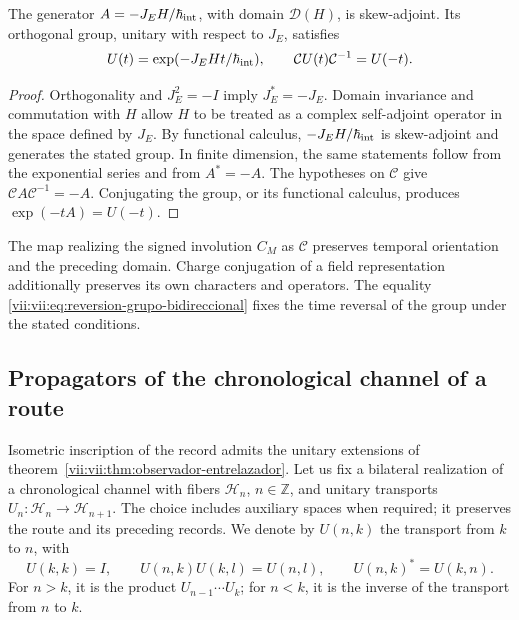 \begin{theorem}
\label{vii:vii:thm:reversion-evolucion}
The generator \(A=-J_EH/\hbar_{\rm int}\), with domain \(\mathcal D(H)\),
is skew-adjoint. Its orthogonal group, unitary with respect to \(J_E\), satisfies
\begin{equation}
 U(t)=\exp(-J_EHt/\hbar_{\rm int}),\qquad
 \mathcal C U(t)\mathcal C^{-1}=U(-t).
 \label{vii:vii:eq:reversion-grupo-bidireccional}
\end{equation}
\end{theorem}
\begin{proof}
Orthogonality and \(J_E^2=-I\) imply \(J_E^*=-J_E\).
Domain invariance and commutation with \(H\) allow
\(H\) to be treated as a complex self-adjoint operator in the space defined by
\(J_E\). By functional calculus, \(-J_EH/\hbar_{\rm int}\) is
skew-adjoint and generates the stated group. In finite dimension, the same
statements follow from the exponential series and from \(A^*=-A\).
The hypotheses on \(\mathcal C\) give
\(\mathcal C A\mathcal C^{-1}=-A\). Conjugating the group, or its functional
calculus, produces \(\exp(-tA)=U(-t)\).
\end{proof}

The map realizing the signed involution \(C_M\) as \(\mathcal C\)
preserves temporal orientation and the preceding domain. Charge conjugation of
a field representation additionally preserves its own
characters and operators. The equality
\eqref{vii:vii:eq:reversion-grupo-bidireccional} fixes the time reversal
of the group under the stated conditions.

\subsection{Propagators of the chronological channel of a route}
\label{vii:vii:subsec:green-cronologico}

Isometric inscription of the record admits the unitary extensions
of theorem~\ref{vii:vii:thm:observador-entrelazador}. Let us fix a bilateral
realization of a chronological channel with fibers \(\mathcal H_n\),
\(n\in\mathbb Z\), and unitary transports
\(U_n:\mathcal H_n\to\mathcal H_{n+1}\).
The choice includes auxiliary spaces when required; it preserves
the route and its preceding records. We denote by \(U(n,k)\) the transport
from \(k\) to \(n\), with
\[
 U(k,k)=I,\qquad U(n,k)U(k,l)=U(n,l),\qquad
 U(n,k)^*=U(k,n).
\]
For \(n>k\), it is the product \(U_{n-1}\cdots U_k\); for \(n<k\),
it is the inverse of the transport from \(n\) to \(k\).


